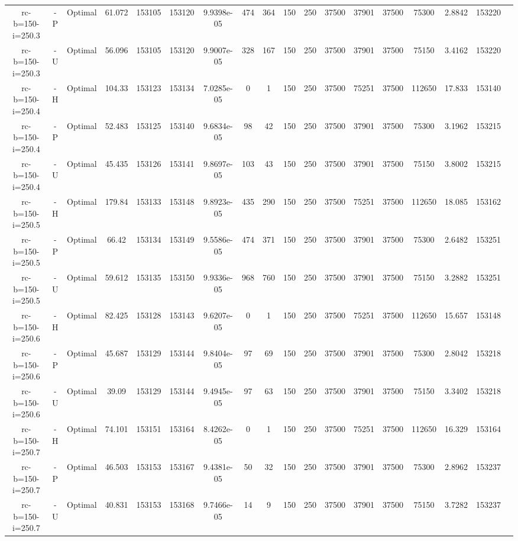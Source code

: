 \documentclass[landscape, a4paper]{article}
\begin{document}
\begin{center}
\begin{tabular}{@{}cccccccccccccccccc@{}}
rc-b=150-i=250.3 & -P & Optimal & 61.072 & 153105 & 153120 & 9.9398e-05 & 474 & 364 & 150 & 250 & 37500 & 37901 & 37500 & 75300 & 2.8842 & 153220 & \\
rc-b=150-i=250.3 & -U & Optimal & 56.096 & 153105 & 153120 & 9.9007e-05 & 328 & 167 & 150 & 250 & 37500 & 37901 & 37500 & 75150 & 3.4162 & 153220 & \\
rc-b=150-i=250.4 & -H & Optimal & 104.33 & 153123 & 153134 & 7.0285e-05 & 0 & 1 & 150 & 250 & 37500 & 75251 & 37500 & 112650 & 17.833 & 153140 & \\
rc-b=150-i=250.4 & -P & Optimal & 52.483 & 153125 & 153140 & 9.6834e-05 & 98 & 42 & 150 & 250 & 37500 & 37901 & 37500 & 75300 & 3.1962 & 153215 & \\
rc-b=150-i=250.4 & -U & Optimal & 45.435 & 153126 & 153141 & 9.8697e-05 & 103 & 43 & 150 & 250 & 37500 & 37901 & 37500 & 75150 & 3.8002 & 153215 & \\
rc-b=150-i=250.5 & -H & Optimal & 179.84 & 153133 & 153148 & 9.8923e-05 & 435 & 290 & 150 & 250 & 37500 & 75251 & 37500 & 112650 & 18.085 & 153162 & \\
rc-b=150-i=250.5 & -P & Optimal & 66.42 & 153134 & 153149 & 9.5586e-05 & 474 & 371 & 150 & 250 & 37500 & 37901 & 37500 & 75300 & 2.6482 & 153251 & \\
rc-b=150-i=250.5 & -U & Optimal & 59.612 & 153135 & 153150 & 9.9336e-05 & 968 & 760 & 150 & 250 & 37500 & 37901 & 37500 & 75150 & 3.2882 & 153251 & \\
rc-b=150-i=250.6 & -H & Optimal & 82.425 & 153128 & 153143 & 9.6207e-05 & 0 & 1 & 150 & 250 & 37500 & 75251 & 37500 & 112650 & 15.657 & 153148 & \\
rc-b=150-i=250.6 & -P & Optimal & 45.687 & 153129 & 153144 & 9.8404e-05 & 97 & 69 & 150 & 250 & 37500 & 37901 & 37500 & 75300 & 2.8042 & 153218 & \\
rc-b=150-i=250.6 & -U & Optimal & 39.09 & 153129 & 153144 & 9.4945e-05 & 97 & 63 & 150 & 250 & 37500 & 37901 & 37500 & 75150 & 3.3402 & 153218 & \\
rc-b=150-i=250.7 & -H & Optimal & 74.101 & 153151 & 153164 & 8.4262e-05 & 0 & 1 & 150 & 250 & 37500 & 75251 & 37500 & 112650 & 16.329 & 153164 & \\
rc-b=150-i=250.7 & -P & Optimal & 46.503 & 153153 & 153167 & 9.4381e-05 & 50 & 32 & 150 & 250 & 37500 & 37901 & 37500 & 75300 & 2.8962 & 153237 & \\
rc-b=150-i=250.7 & -U & Optimal & 40.831 & 153153 & 153168 & 9.7466e-05 & 14 & 9 & 150 & 250 & 37500 & 37901 & 37500 & 75150 & 3.7282 & 153237 & \\

\end{tabular}
\end{center}
\end{document}
